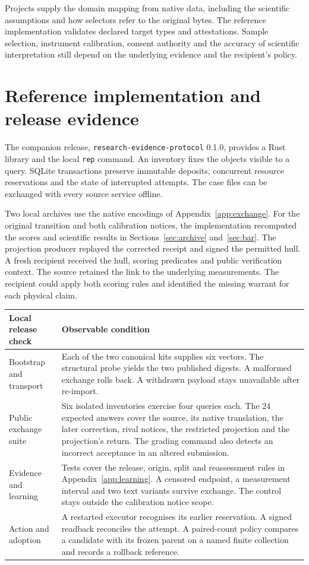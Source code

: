 \documentclass[11pt,a4paper]{article}
\newcommand{\partpage}[1]{\clearpage\section{#1}}
\newcommand{\topic}[1]{\par\smallskip{\sffamily\bfseries\color{ink}#1\par}\nobreak}
\begin{document}
Projects supply the domain mapping from native data, including the scientific assumptions and how selectors refer to the original bytes. The reference implementation validates declared target types and attestations. Sample selection, instrument calibration, consent authority and the accuracy of scientific interpretation still depend on the underlying evidence and the recipient's policy.

\partpage{Reference implementation and release evidence}\label{app:release}
The companion release, \texttt{research-evidence-protocol} 0.1.0, provides a Rust library and the local \texttt{rep} command. An inventory fixes the objects visible to a query. SQLite transactions preserve immutable deposits, concurrent resource reservations and the state of interrupted attempts. The case files can be exchanged with every source service offline.

\topic{What was executed}
Two local archives use the native encodings of Appendix~\ref{app:exchange}. For the original transition and both calibration notices, the implementation recomputed the scores and scientific results in Sections~\ref{sec:archive} and~\ref{sec:bar}. The projection producer replayed the corrected receipt and signed the permitted hull. A fresh recipient received the hull, scoring predicates and public verification context. The source retained the link to the underlying measurements. The recipient could apply both scoring rules and identified the missing warrant for each physical claim.

\small
\begin{tabularx}{\linewidth}{@{}L{.24\linewidth}Y@{}}
\toprule
\textbf{Local release check} & \textbf{Observable condition} \\ \midrule
Bootstrap and transport & Each of the two canonical kits supplies six vectors. The structural probe yields the two published digests. A malformed exchange rolls back. A withdrawn payload stays unavailable after re-import. \\
Public exchange suite & Six isolated inventories exercise four queries each. The 24 expected answers cover the source, its native translation, the later correction, rival notices, the restricted projection and the projection's return. The grading command also detects an incorrect acceptance in an altered submission. \\
Evidence and learning & Tests cover the release, origin, split and reassessment rules in Appendix~\ref{app:learning}. A censored endpoint, a measurement interval and two text variants survive exchange. The control stays outside the calibration notice scope. \\
Action and adoption & A restarted executor recognises its earlier reservation. A signed readback reconciles the attempt. A paired-count policy compares a candidate with its frozen parent on a named finite collection and records a rollback reference. \\
\bottomrule
\end{tabularx}
\normalsize
\end{document}
